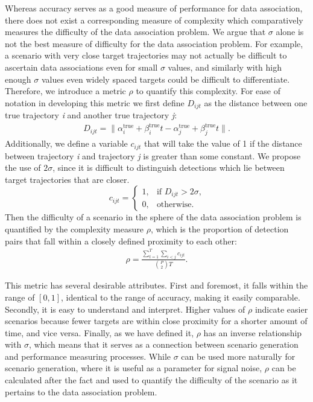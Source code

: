 Whereas accuracy serves as a good measure of performance for data association, there does not exist a corresponding measure of complexity which comparatively measures the difficulty of the data association problem. We argue that $\sigma$ alone is not the best measure of difficulty for the data association problem. For example, a scenario with very close target trajectories may not actually be difficult to ascertain data associations even for small $\sigma$ values, and similarly with high enough $\sigma$ values even widely spaced targets could be difficult to differentiate. Therefore, we introduce a metric $\rho$ to quantify this complexity. For ease of notation in developing this metric we first define $D_{ijt}$ as the distance between one true trajectory \textit{i} and another true trajectory \textit{j}:
\begin{align*}
D_{ijt} = \| \alpha^{\text{true}}_{i} + \beta^{\text{true}}_{i}t - \alpha^{\text{true}}_{j} + \beta^{\text{true}}_{j}t \|.
\end{align*}
Additionally, we define a variable $c_{ijt}$ that will take the value of 1 if the distance between trajectory \textit{i} and trajectory \textit{j} is greater than some constant. We propose the use of $2\sigma$, since it is difficult to distinguish detections which lie between target trajectories that are closer. 
\[c_{ijt} = 
\begin{cases}
1, & \text{if $D_{ijt} > 2\sigma$,}\\
0, & \text{otherwise.}
\end{cases}\]
Then the difficulty of a scenario in the sphere of the data association problem is quantified by the complexity measure $\rho$, which is the proportion of detection pairs that fall within a closely defined proximity to each other:
\begin{align*}
\rho =  \frac{\sum\limits_{t=1}^{T}\sum\limits_{i<j}c_{ijt}}{\binom{P}{2} T}.
\end{align*}

This metric has several desirable attributes. First and foremost, it falls within the range of $[0,1]$, identical to the range of accuracy, making it easily comparable. Secondly, it is easy to understand and interpret. Higher values of $\rho$ indicate easier scenarios because fewer targets are within close proximity for a shorter amount of time, and vice versa. Finally, as we have defined it, $\rho$ has an inverse relationship with $\sigma$, which means that it serves as a connection between scenario generation and performance measuring processes. While $\sigma$ can be used more naturally for scenario generation, where it is useful as a parameter for signal noise, $\rho$ can be calculated after the fact and used to quantify the difficulty of the scenario as it pertains to the data association problem. 

